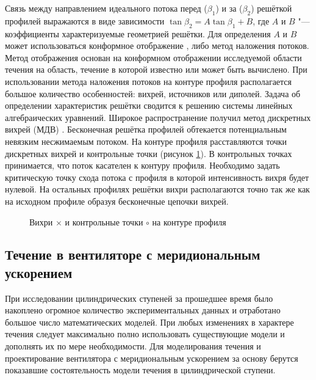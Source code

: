 Связь между направлением идеального потока перед (\(\beta_1\)) и за (\(\beta_2\)) решёткой профилей выражаются в виде зависимости \( \tan\beta_2 = A\tan\beta_1+B\), где \(A\) и \(B\) "--- коэффициенты характеризуемые геометрией решётки. Для определения \(A\) и \(B\) может использоваться конформное отображение \cite{Bloch1961}, либо метод наложения потоков. Метод отображения основан на конформном отображении исследуемой области течения на область, течение в которой известно или может быть вычислено. При использовании метода наложения потоков на контуре профиля располагается большое количество особенностей: вихрей, источников или диполей. Задача об определении характеристик решётки сводится к решению системы линейных алгебраических уравнений. Широкое распространение получил метод дискретных вихрей (МДВ) \cite{Belozerovskiy1978}. Бесконечная решётка профилей обтекается потенциальным невязким несжимаемым потоком. На контуре профиля расставляются точки дискретных вихрей и контрольные точки (рисунок \ref{fig:foilVortex}). В контрольных точках принимается, что поток касателен к контуру профиля. Необходимо задать критическую точку схода потока с профиля в которой интенсивность вихря будет нулевой. На остальных профилях решётки вихри располагаются точно так же как на исходном профиле образуя бесконечные цепочки вихрей. 

\begin{figure} [ht]
	\caption{Вихри \(\times\) и контрольные точки \(\circ\) на контуре профиля} 
	\label{fig:foilVortex}
\end{figure}

\subsection{Течение в вентиляторе с меридиональным ускорением}\label{sec:ch1/mrdnl}

При исследовании цилиндрических ступеней за прошедшее время было накоплено огромное количество экспериментальных данных и отработано большое число математических моделей. При любых изменениях в характере течения следует максимально полно использовать существующие модели и дополнять их по мере необходимости. Для моделирования течения и проектирование вентилятора с меридиональным ускорением за основу берутся показавшие состоятельность модели течения в цилиндрической ступени.

